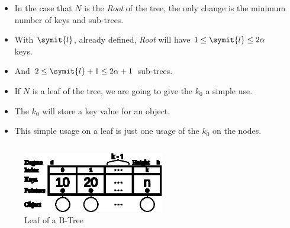 \documentclass{beamer}
\begin{document}
\begin{frame}
    \begin{columns}
        \begin{column}{\textlecolumn}
            \begin{block}{}
                \begin{itemize}
                    \item In the case that \(N\) is the \emph{Root} of the tree, the only change is the minimum number of keys and sub-trees.
                    \item With \(\symit{l}\), already defined, \emph{Root} will have \(1 \leq \symit{l} \leq 2\alpha\) keys.
                    \item And \(2 \leq \symit{l} + 1 \leq 2\alpha + 1\) sub-trees.
                \end{itemize}
                \begin{itemize}
                    \item If \(N\) is a leaf of the tree, we are going to give the \(k_0\) a simple use.
                    \item The \(k_0\) will store a key value for an object.
                    \item This simple usage on a leaf is just one usage of the \(k_0\) on the nodes.
                \end{itemize}
            \end{block}
        \end{column}
        \begin{column}{\textricolumn}
            \begin{block}{}
            \end{block}
        \end{column}
    \end{columns}
    \begin{figure}
        \includegraphics[width=0.55\textwidth]{resources/made/single_leaf.eps}
        \caption[]{Leaf of a B-Tree}
    \end{figure}

    \framebreak


\end{frame}
\end{document}
